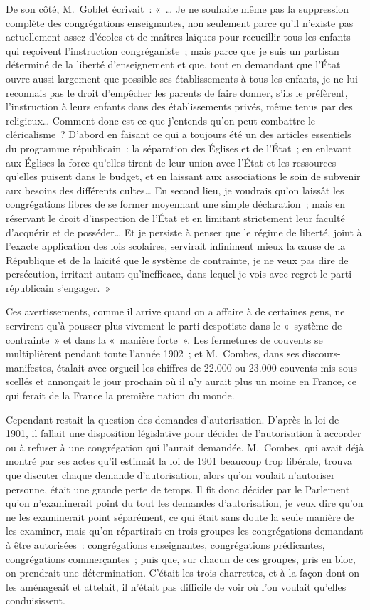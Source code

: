 \documentclass[french,twoside]{book} %
\begin{document}
De son côté, M. Goblet écrivait : « … Je ne souhaite même pas la suppression complète des congrégations enseignantes, non seulement parce qu’il n’existe pas actuellement assez d’écoles et de maîtres laïques pour recueillir tous les enfants qui reçoivent l’instruction congréganiste ; mais parce que je suis un partisan déterminé de la liberté d’enseignement et que, tout en demandant que l’État ouvre aussi largement que possible ses établissements  à tous les enfants, je ne lui reconnais pas le droit d’empêcher les parents de faire donner, s’ils le préfèrent, l’instruction à leurs enfants dans des établissements privés, même tenus par des religieux… Comment donc est-ce que j’entends qu’on peut combattre le cléricalisme ? D’abord en faisant ce qui a toujours été un des articles essentiels du programme républicain : la séparation des Églises et de l’État ; en enlevant aux Églises la force qu’elles tirent de leur union avec l’État et les ressources qu’elles puisent dans le budget, et en laissant aux associations le soin de subvenir aux besoins des différents cultes… En second lieu, je voudrais qu’on laissât les congrégations libres de se former moyennant une simple déclaration ; mais en réservant le droit d’inspection de l’État et en limitant strictement leur faculté d’acquérir et de posséder… Et je persiste à penser que le régime de liberté, joint à l’exacte application des lois scolaires, servirait infiniment mieux la cause de la République et de la laïcité que le système de contrainte, je ne veux pas dire de persécution, irritant autant qu’inefficace, dans lequel je vois avec regret le parti républicain s’engager. »\par
Ces avertissements, comme il arrive quand on a affaire à de certaines gens, ne servirent qu’à pousser  plus vivement le parti despotiste dans le « système de contrainte » et dans la « manière forte ». Les fermetures de couvents se multiplièrent pendant toute l’année 1902 ; et M. Combes, dans ses discours-manifestes, étalait avec orgueil les chiffres de 22.000 ou 23.000 couvents mis sous scellés et annonçait le jour prochain où il n’y aurait plus un moine en France, ce qui ferait de la France la première nation du monde.\par
Cependant restait la question des demandes d’autorisation. D’après la loi de 1901, il fallait une disposition législative pour décider de l’autorisation à accorder ou à refuser à une congrégation qui l’aurait demandée. M. Combes, qui avait déjà montré par ses actes qu’il estimait la loi de 1901 beaucoup trop libérale, trouva que discuter chaque demande d’autorisation, alors qu’on voulait n’autoriser personne, était une grande perte de temps. Il fit donc décider par le Parlement qu’on n’examinerait point du tout les demandes d’autorisation, je veux dire qu’on ne les examinerait point séparément, ce qui était sans doute la seule manière de les examiner, mais qu’on répartirait en trois groupes les congrégations demandant à être autorisées : congrégations enseignantes, congrégations prédicantes, congrégations commerçantes ; puis que, sur chacun de ces groupes, pris en bloc, on prendrait  une détermination. C’était les trois charrettes, et à la façon dont on les aménageait et attelait, il n’était pas difficile de voir où l’on voulait qu’elles conduisissent.\par
\end{document}
